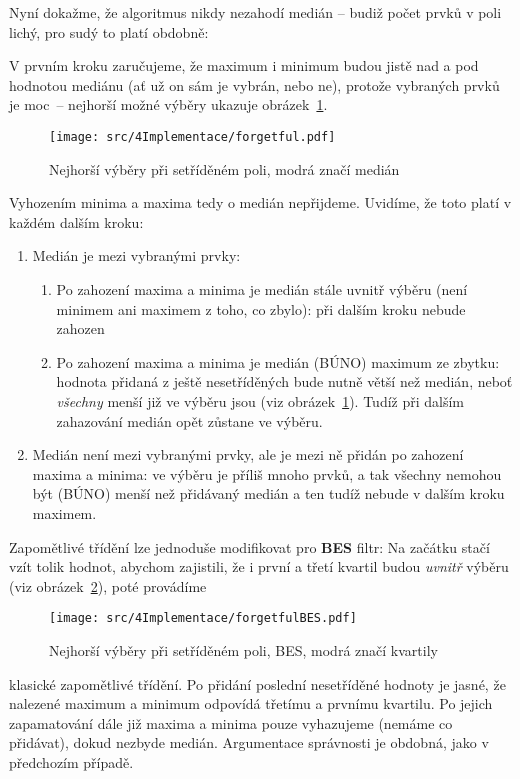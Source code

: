         Nyní dokažme, že algoritmus nikdy nezahodí medián -- budiž počet prvků v poli lichý, pro sudý to platí obdobně:

        V prvním kroku zaručujeme, že maximum i minimum budou jistě nad a pod hodnotou mediánu (ať už on sám je vybrán, nebo ne), protože vybraných prvků je \bq moc\eq ~-- nejhorší možné výběry ukazuje obrázek~\ref{obr forgetful}.
        \begin{figure}[h]\label{obr forgetful}
        \begin{center}
          \texttt{[image: src/4Implementace/forgetful.pdf]}
          \caption{Nejhorší výběry při setříděném poli, modrá značí medián}
          \end{center}
        \end{figure}
        Vyhozením minima a maxima tedy o medián nepřijdeme. Uvidíme, že toto platí v každém dalším kroku:
        \begin{enumerate}
          \item Medián je mezi vybranými prvky:
            \begin{enumerate}
                \item Po zahození maxima a minima je medián stále uvnitř výběru (není minimem ani maximem z toho, co zbylo): při dalším kroku nebude zahozen
                \item Po zahození maxima a minima je medián (BÚNO) maximum ze zbytku: hodnota přidaná z ještě nesetříděných bude nutně větší než medián, neboť \emph{všechny} menší již ve výběru jsou (viz obrázek~\ref{obr forgetful}). Tudíž při dalším zahazování medián opět zůstane ve výběru.
            \end{enumerate}
          \item Medián není mezi vybranými prvky, ale je mezi ně přidán po zahození maxima a minima: ve výběru je příliš mnoho prvků, a tak všechny nemohou být (BÚNO) menší než přidávaný medián a ten tudíž nebude v dalším kroku maximem.
        \end{enumerate}

        Zapomětlivé třídění lze jednoduše modifikovat pro \textbf{BES} filtr: Na začátku stačí vzít tolik hodnot, abychom zajistili, že i první a třetí kvartil budou \emph{uvnitř} výběru (viz obrázek~\ref{obr forget BES}), poté provádíme
        \begin{figure}[h]\label{obr forget BES}
        \begin{center}
          \texttt{[image: src/4Implementace/forgetfulBES.pdf]}
          \caption{Nejhorší výběry při setříděném poli, BES, modrá značí kvartily}
          \end{center}
        \end{figure}
        klasické zapomětlivé třídění. Po přidání poslední nesetříděné hodnoty je jasné, že nalezené maximum a minimum odpovídá třetímu a prvnímu kvartilu. Po jejich zapamatování dále již maxima a minima pouze vyhazujeme (nemáme co přidávat), dokud nezbyde medián. Argumentace správnosti je obdobná, jako v předchozím případě.

